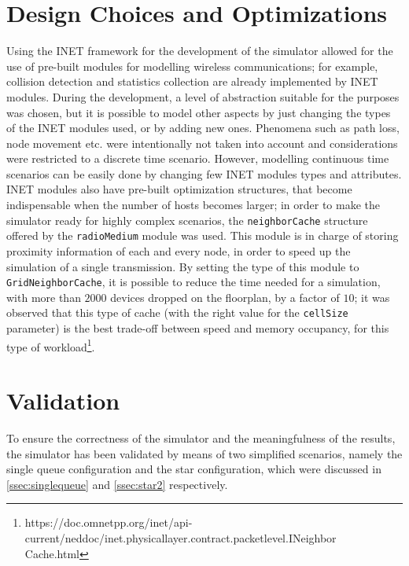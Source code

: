\section{Design Choices and Optimizations}
Using the INET framework for the development of the simulator allowed for the
use of pre-built modules for modelling wireless communications; for example,
collision detection and statistics collection are already implemented by INET
modules. During the development, a level of abstraction suitable for the
purposes was chosen, but it is possible to model other aspects by just 
changing the types of the INET modules used, or by adding new ones. Phenomena
such as path loss, node movement etc. were intentionally not taken into account
and considerations were restricted to a discrete time scenario. However,
modelling continuous time scenarios can be easily done by changing few INET
modules types and attributes.\\
INET modules also have pre-built optimization structures, that become
indispensable when the number of hosts becomes larger; in order to make the
simulator ready for highly complex scenarios, the \texttt{neighborCache}
structure offered by the \texttt{radioMedium} module was used. This module is
in charge of storing proximity information of each and every node, in order to
speed up the simulation of a single transmission. By setting the type of this
module to \texttt{GridNeighborCache}, it is possible to reduce the time needed
for a simulation, with more than $2000$ devices dropped on the floorplan, by a
factor of $10$; it was observed that this type of cache (with the right value
for the \texttt{cellSize} parameter) is the best trade-off between speed and
memory occupancy, for this type of
workload\footnote{https://doc.omnetpp.org/inet/api-current/neddoc/inet.physicallayer.contract.packetlevel.INeighbor\\
Cache.html}.  
\section{Validation}
To ensure the correctness of the simulator and the meaningfulness of the
results, the simulator has been validated by means of two simplified scenarios,
namely the single queue configuration and the star configuration, which were
discussed in \ref{ssec:singlequeue} and \ref{ssec:star2} respectively.
